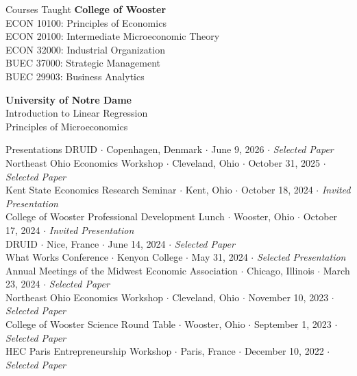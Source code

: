 \documentclass{resume} %
\begin{document}

\begin{rSection}{Courses Taught}
	{\bf College of Wooster}  \\ 
	ECON 10100: Principles of Economics \\
	ECON 20100: Intermediate Microeconomic Theory \\
	ECON 32000: Industrial Organization \\
	BUEC 37000: Strategic Management \\
	BUEC 29903: Business Analytics

	{\bf University of Notre Dame}  \\ 
	Introduction to Linear Regression \\
    Principles of Microeconomics
\end{rSection}

\newpage
\begin{rSection}{Presentations}
DRUID $\cdot$ Copenhagen, Denmark $\cdot$ June 9, 2026 $\cdot$ \textit{Selected Paper} \\
Northeast Ohio Economics Workshop $\cdot$ Cleveland, Ohio $\cdot$ October 31, 2025 $\cdot$ \textit{Selected Paper} \\
Kent State Economics Research Seminar $\cdot$ Kent, Ohio $\cdot$ October 18, 2024 $\cdot$ \textit{Invited Presentation} \\
College of Wooster Professional Development Lunch $\cdot$ Wooster, Ohio $\cdot$ October 17, 2024 $\cdot$ \textit{Invited Presentation} \\
DRUID $\cdot$ Nice, France $\cdot$ June 14, 2024 $\cdot$ \textit{Selected Paper} \\
What Works Conference $\cdot$ Kenyon College $\cdot$ May 31, 2024 $\cdot$ \textit{Selected Presentation} \\
Annual Meetings of the Midwest Economic Association $\cdot$ Chicago, Illinois $\cdot$ March 23, 2024 $\cdot$ \textit{Selected Paper} \\
Northeast Ohio Economics Workshop $\cdot$ Cleveland, Ohio $\cdot$ November 10, 2023 $\cdot$ \textit{Selected Paper} \\
College of Wooster Science Round Table $\cdot$ Wooster, Ohio $\cdot$ September 1, 2023 $\cdot$ \textit{Selected Paper} \\
HEC Paris Entrepreneurship Workshop $\cdot$ Paris, France $\cdot$ December 10, 2022 $\cdot$ \textit{Selected Paper} 
\end{rSection}
\end{document}
